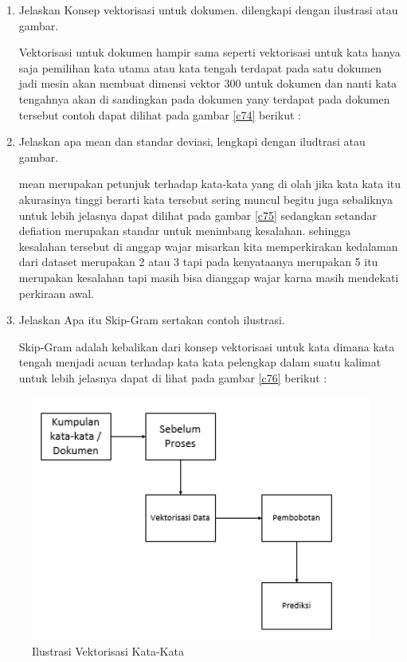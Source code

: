 \begin{enumerate}
\item Jelaskan Konsep vektorisasi untuk dokumen. dilengkapi dengan ilustrasi atau gambar. \par
Vektorisasi untuk dokumen hampir sama seperti vektorisasi untuk kata hanya saja pemilihan kata utama atau kata tengah terdapat pada satu dokumen jadi mesin akan membuat dimensi vektor 300 untuk dokumen dan nanti kata tengahnya akan di sandingkan pada dokumen yany terdapat pada dokumen tersebut contoh dapat dilihat pada gambar \ref{c74} berikut : 

\item Jelaskan apa mean dan standar deviasi, lengkapi dengan iludtrasi atau gambar. \par
mean merupakan petunjuk terhadap kata-kata yang di olah jika kata kata itu akurasinya tinggi berarti kata tersebut sering muncul begitu juga sebaliknya untuk lebih jelasnya dapat dilihat pada gambar \ref{c75} sedangkan setandar defiation merupakan standar untuk menimbang kesalahan. sehingga kesalahan tersebut di anggap wajar misarkan kita memperkirakan kedalaman dari dataset merupakan 2 atau 3 tapi pada kenyataanya merupakan 5 itu merupakan kesalahan tapi masih bisa dianggap wajar karna masih mendekati perkiraan awal.

\item Jelaskan Apa itu Skip-Gram sertakan contoh ilustrasi. \par
Skip-Gram adalah kebalikan dari konsep vektorisasi untuk kata dimana kata tengah menjadi acuan terhadap kata kata pelengkap dalam suatu kalimat untuk lebih jelasnya dapat di lihat pada gambar \ref{c76} berikut :

\end{enumerate}

\begin{figure}
      \centerline{\includegraphics[width=1\textwidth]
      {figures/cokro/c71}}
      \caption{Ilustrasi Vektorisasi Kata-Kata}
      \label{c71}
      \end{figure}


